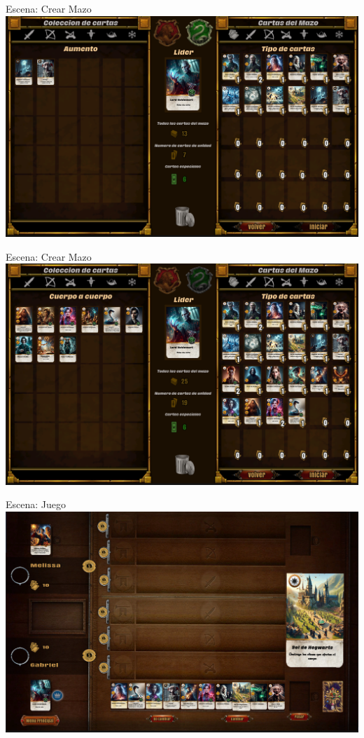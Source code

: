 \documentclass[a4paper, 12pt]{beamer}
\begin{document}
\begin{frame}{\textcolor{plata}{Escena: Crear Mazo}}
\includegraphics[scale = 0.2]{images/image4.png}
\end{frame}

\begin{frame}{\textcolor{plata}{Escena: Crear Mazo}}
\includegraphics[scale = 0.2]{images/image5.png}
\end{frame}

\begin{frame}{\textcolor{plata}{Escena: Juego}}
\includegraphics[scale = 0.2]{images/image6.png}
\end{frame}
\end{document}
